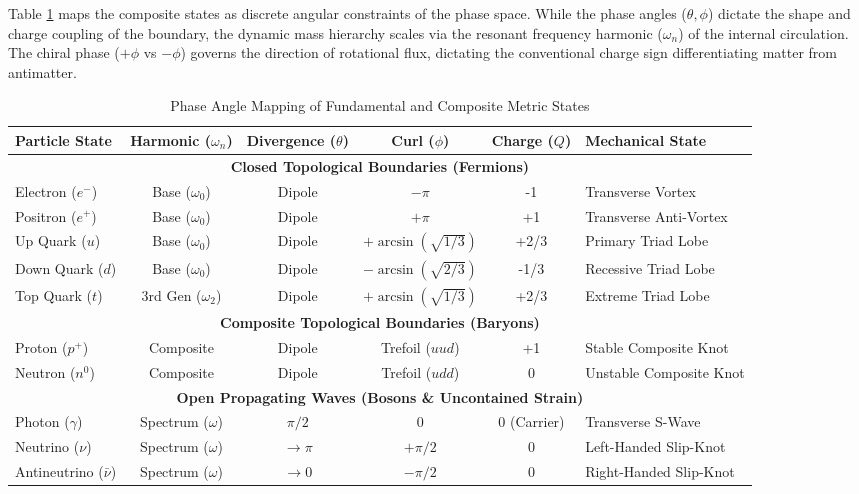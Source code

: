 Table \ref{tab:wave_phases} maps the composite states as discrete angular constraints of the phase space. While the phase angles ($\theta, \phi$) dictate the shape and charge coupling of the boundary, the dynamic mass hierarchy scales via the resonant frequency harmonic ($\omega_n$) of the internal circulation. The chiral phase ($+\phi$ vs $-\phi$) governs the direction of rotational flux, dictating the conventional charge sign differentiating matter from antimatter. 

\begin{table}[h]
\centering
\begin{tabular}{l c c c c l}
\hline
\textbf{Particle State} & \textbf{Harmonic ($\omega_n$)} & \textbf{Divergence ($\theta$)} & \textbf{Curl ($\phi$)} & \textbf{Charge ($Q$)} & \textbf{Mechanical State} \\
\hline
\multicolumn{6}{c}{\textbf{Closed Topological Boundaries (Fermions)}} \\
\hline
Electron ($e^-$) & Base ($\omega_0$) & Dipole & $-\pi$ & -1 & Transverse Vortex \\
Positron ($e^+$) & Base ($\omega_0$) & Dipole & $+\pi$ & +1 & Transverse Anti-Vortex \\
Up Quark ($u$) & Base ($\omega_0$) & Dipole & $+\arcsin(\sqrt{1/3})$ & +2/3 & Primary Triad Lobe \\
Down Quark ($d$) & Base ($\omega_0$) & Dipole & $-\arcsin(\sqrt{2/3})$ & -1/3 & Recessive Triad Lobe \\
Top Quark ($t$) & 3rd Gen ($\omega_2$) & Dipole & $+\arcsin(\sqrt{1/3})$ & +2/3 & Extreme Triad Lobe \\
\hline
\multicolumn{6}{c}{\textbf{Composite Topological Boundaries (Baryons)}} \\
\hline
Proton ($p^+$) & Composite & Dipole & Trefoil ($uud$) & +1 & Stable Composite Knot \\
Neutron ($n^0$) & Composite & Dipole & Trefoil ($udd$) & 0 & Unstable Composite Knot \\
\hline
\multicolumn{6}{c}{\textbf{Open Propagating Waves (Bosons \& Uncontained Strain)}} \\
\hline
Photon ($\gamma$) & Spectrum ($\omega$) & $\pi/2$ & $0$ & $0$ (Carrier) & Transverse S-Wave \\
Neutrino ($\nu$) & Spectrum ($\omega$) & $\to \pi$ & $+\pi/2$ & 0 & Left-Handed Slip-Knot \\
Antineutrino ($\bar{\nu}$) & Spectrum ($\omega$) & $\to 0$ & $-\pi/2$ & 0 & Right-Handed Slip-Knot \\
\hline
\end{tabular}
\caption{Phase Angle Mapping of Fundamental and Composite Metric States}
\label{tab:wave_phases}
\end{table}


